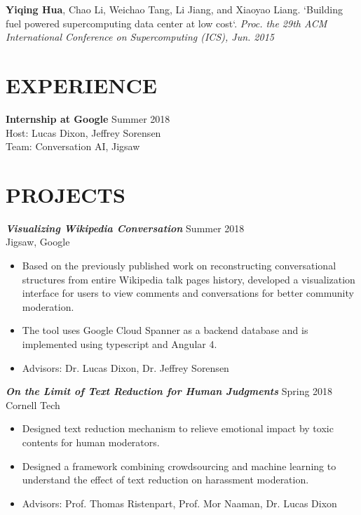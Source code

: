 \documentclass[margin, 10pt]{res} %
\begin{document}
\begin{resume}
\textbf{Yiqing Hua}, Chao Li, Weichao Tang, Li Jiang, and Xiaoyao Liang.
`Building fuel powered supercomputing data center at low cost`.
\textit{Proc. the 29th ACM International Conference on Supercomputing (ICS), Jun. 2015}


\section{EXPERIENCE}
\textbf{Internship at Google} \hfill Summer 2018\\
Host: Lucas Dixon, Jeffrey Sorensen\\
Team: Conversation AI, Jigsaw

\section{PROJECTS}

{\sl \textbf{Visualizing Wikipedia Conversation}} \hfill Summer 2018\\
Jigsaw, Google
\begin{itemize}
\item Based on the previously published work on reconstructing conversational structures from
      entire Wikipedia talk pages history, developed a visualization interface for users to view
      comments and conversations for better community moderation.
\item The tool uses Google Cloud Spanner as a backend database and is implemented using typescript and Angular 4.
\item Advisors: Dr. Lucas Dixon, Dr. Jeffrey Sorensen
\end{itemize}

{\sl \textbf{On the Limit of Text Reduction for Human Judgments}} \hfill Spring 2018\\
Cornell Tech
\begin{itemize}
\item Designed text reduction mechanism to relieve emotional impact by toxic contents for human moderators.
\item Designed a framework combining crowdsourcing and machine learning to understand the effect of text reduction on harassment moderation.
\item Advisors: Prof. Thomas Ristenpart, Prof. Mor Naaman, Dr. Lucas Dixon
\end{itemize}


\end{resume}
\end{document}
